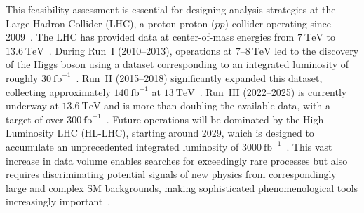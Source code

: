 This feasibility assessment is essential for designing analysis strategies at the Large Hadron Collider (LHC), a proton-proton ($pp$) collider operating since 2009~\cite{Evans_2008,ATLAS:2008xda,CMS:2008xjf}. The LHC has provided data at center-of-mass energies from $7~\mathrm{TeV}$ to $13.6~\mathrm{TeV}$~\cite{CMS:2021ctt,lumiRef}. During Run~I (2010–2013), operations at $7$–$8~\mathrm{TeV}$ led to the discovery of the Higgs boson using a dataset corresponding to an integrated luminosity of roughly $30~\mathrm{fb}^{-1}$~\cite{ATLAS:2012yve,CMS:2012gu}. Run~II (2015–2018) significantly expanded this dataset, collecting approximately $140~\mathrm{fb}^{-1}$ at $13~\mathrm{TeV}$~\cite{lumiRef,CMS:2021ctt}. Run~III (2022–2025) is currently underway at $13.6~\mathrm{TeV}$ and is more than doubling the available data, with a target of over $300~\mathrm{fb}^{-1}$~\cite{lumiRef}. Future operations will be dominated by the High-Luminosity LHC (HL-LHC), starting around 2029, which is designed to accumulate an unprecedented integrated luminosity of $3000~\mathrm{fb}^{-1}$~\cite{CMS-PAS-FTR-13-014,Apollinari2017_HLLHC}. This vast increase in data volume enables searches for exceedingly rare processes but also requires discriminating potential signals of new physics from correspondingly large and complex SM backgrounds, making sophisticated phenomenological tools increasingly important~\cite{Alwall:2014hca,deFavereau:2013fsa}.


 
%  
%  
%  
%  
